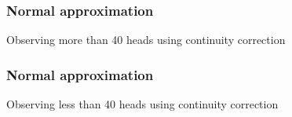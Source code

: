 \documentclass[handout]{beamer}
\begin{document}
   \begin{frame}
   \frametitle{Normal approximation}
   \begin{center}
   \end{center}
   Observing more than 40 heads using continuity correction
   \end{frame}



   \begin{frame}
   \frametitle{Normal approximation}
   \begin{center}
   \end{center}
   Observing less than 40 heads using continuity correction
   \end{frame}

\end{document}
